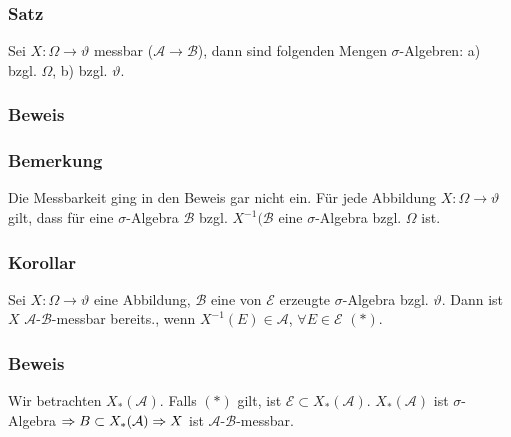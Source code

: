 \subsubsection{Satz}
Sei $X\colon\Omega\to\vartheta$ messbar ($\mathcal{A}\to\mathcal{B}$), dann sind folgenden Mengen $\sigma$-Algebren:
a) bzgl. $\Omega$, b) bzgl. $\vartheta$.
\subsubsection{Beweis}
\subsubsection{Bemerkung}
Die Messbarkeit ging in den Beweis gar nicht ein. F\"ur jede Abbildung $X\colon\Omega\to\vartheta$ gilt, dass f\"ur eine $\sigma$-Algebra $\mathcal{B}$ bzgl. $X^{-1}(\mathcal{B}$ eine $\sigma$-Algebra bzgl. $\Omega$ ist.
\subsubsection{Korollar}
Sei $X\colon\Omega\to\vartheta$ eine Abbildung, $\mathcal{B}$ eine von $\mathcal{E}$ erzeugte $\sigma$-Algebra bzgl. $\vartheta$. Dann ist $X$ $\mathcal{A}$-$\mathcal{B}$-messbar bereits., wenn $X^{-1}(E)\in\mathcal{A}$, $\forall E\in\mathcal{E}$ $(*)$.
\subsubsection{Beweis}
Wir betrachten $X_*(\mathcal{A})$. Falls $(*)$ gilt, ist $\mathcal{E}\subset X_*(\mathcal{A})$. $X_*(\mathcal{A})$ ist $\sigma$-Algebra $\Rightarrow B\subset X_*(\mathcal{A})\Rightarrow X$ ist $\mathcal{A}$-$\mathcal{B}$-messbar.
